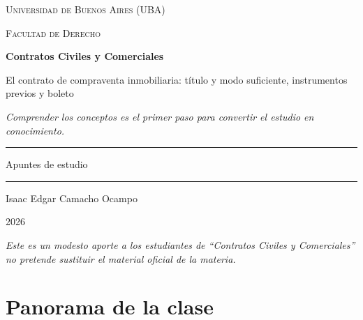 \documentclass[12pt,oneside]{book}
\newcommand{\universidad}{Universidad de Buenos Aires (UBA)}
\newcommand{\facultad}{Facultad de Derecho}
\newcommand{\materia}{Contratos Civiles y Comerciales}
\newcommand{\titulo}{El contrato de compraventa inmobiliaria: título y modo suficiente, instrumentos previos y boleto}
\newcommand{\autor}{Isaac Edgar Camacho Ocampo}
\newcommand{\anio}{2026}
\begin{document}
\begin{titlepage}

\thispagestyle{empty}

\begin{center}

\vspace*{1cm}

{\large \textsc{\universidad}}

\vspace{0.2cm}

{\large \textsc{\facultad}}

\vspace{3cm}

{\Huge \textbf{\materia}}

\vspace{1cm}

{\LARGE \titulo}

\vspace{0.8cm}

\textit{Comprender los conceptos es el primer paso para convertir el estudio en conocimiento.}

\vspace{1.2cm}

\rule{0.70\textwidth}{0.5pt}

\vspace{0.5cm}

{\large Apuntes de estudio}

\vspace{0.5cm}

\rule{0.70\textwidth}{0.5pt}

\vfill

{\large \autor}

\vspace{0.3cm}

{\large \anio}

\end{center}

\vfill

\begin{flushleft}
\textit{Este es un modesto aporte a los estudiantes de ``\materia'' no pretende sustituir el material oficial de la materia.}
\end{flushleft}

\end{titlepage}

\tableofcontents

\chapter*{Panorama de la clase}
\end{document}
